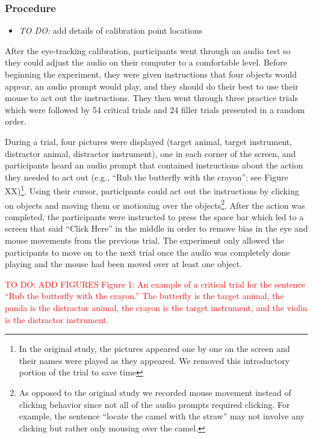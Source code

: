 \documentclass[
  man,floatsintext]{apa6}
\providecommand{\tightlist}{%
  \setlength{\itemsep}{0pt}\setlength{\parskip}{0pt}}
\begin{document}
\hypertarget{procedure-3}{%
\subsubsection{Procedure}\label{procedure-3}}

\begin{itemize}
\tightlist
\item
  \emph{TO DO:} add details of calibration point locations
\end{itemize}

After the eye-tracking calibration, participants went through an audio
test so they could adjust the audio on their computer to a comfortable
level. Before beginning the experiment, they were given instructions
that four objects would appear, an audio prompt would play, and they
should do their best to use their mouse to act out the instructions.
They then went through three practice trials which were followed by 54
critical trials and 24 filler trials presented in a random order.

During a trial, four pictures were displayed (target animal, target
instrument, distractor animal, distractor instrument), one in each
corner of the screen, and participants heard an audio prompt that
contained instructions about the action they needed to act out (e.g.,
``Rub the butterfly with the crayon''; see Figure XX)\footnote{In the original study, the pictures appeared one by one on the
  screen and their names were played as they appeared. We removed this
  introductory portion of the trial to save time}. Using their
cursor, participants could act out the instructions by clicking on
objects and moving them or motioning over the objects\footnote{As opposed to the original study we recorded mouse movement
  instead of clicking behavior since not all of the audio prompts
  required clicking. For example, the sentence ``locate the camel with
  the straw'' may not involve any clicking but rather only mousing over
  the camel.}. After the
action was completed, the participants were instructed to press the
space bar which led to a screen that said ``Click Here'' in the middle in
order to remove bias in the eye and mouse movements from the previous
trial. The experiment only allowed the participants to move on to the
next trial once the audio was completely done playing and the mouse had
been moved over at least one object.

\textcolor{red}{TO DO: ADD FIGURES Figure 1: An example of a critical trial for the sentence “Rub the butterfly with the crayon.” The butterfly is the target animal, the panda is the distractor animal, the crayon is the target instrument, and the violin is the distractor instrument.}
\end{document}
